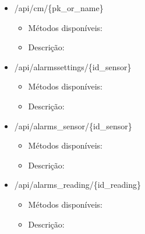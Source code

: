 \begin{itemize}
	
	\item /api/cm/\{pk\_or\_name\}
	\begin{itemize}
		\item Métodos disponíveis: 
		\item Descrição: 
	\end{itemize}
	
	
	\item /api/alarmssettings/\{id\_sensor\}
	\begin{itemize}
		\item Métodos disponíveis: 
		\item Descrição: 
	\end{itemize}
	
	
	\item /api/alarms\_sensor/\{id\_sensor\}
	\begin{itemize}
		\item Métodos disponíveis: 
		\item Descrição: 
	\end{itemize}
	
	
	\item /api/alarms\_reading/\{id\_reading\}
	\begin{itemize}
		\item Métodos disponíveis: 
		\item Descrição: 
	\end{itemize}
	
	
	
	
	
\end{itemize}

